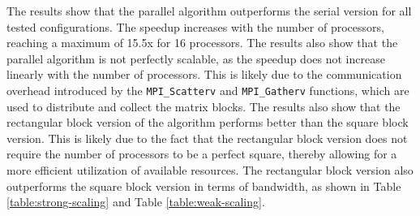 The results show that the parallel algorithm outperforms the serial version for all tested configurations. The speedup increases %
with the number of processors, reaching a maximum of 15.5x for 16 processors. The results also show that the parallel algorithm %
is not perfectly scalable, as the speedup does not increase linearly with the number of processors. This is likely due to the %
communication overhead introduced by the \texttt{MPI\_Scatterv} and \texttt{MPI\_Gatherv} functions, which are used to distribute %
and collect the matrix blocks. The results also show that the rectangular block version of the algorithm performs better than the %
square block version. This is likely due to the fact that the rectangular block version does not require the number of processors %
to be a perfect square, thereby allowing for a more efficient utilization of available resources. The rectangular block version %
also outperforms the square block version in terms of bandwidth, as shown in Table \ref{table:strong-scaling} and Table \ref{table:weak-scaling}.

